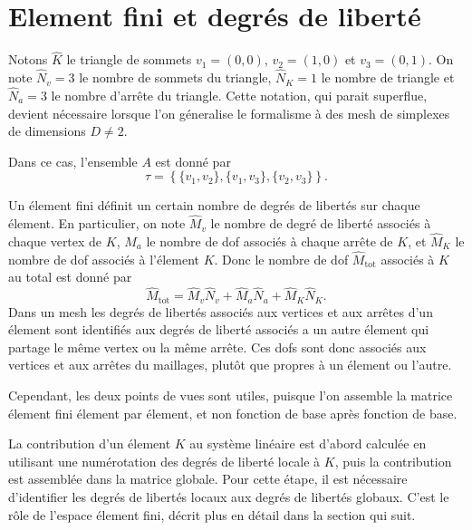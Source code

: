\section{Element fini et degr\'es de libert\'e}
Notons $\hat K$ le triangle de sommets $v_1 = (0,0)$, $v_2 = (1,0)$ et
$v_3 = (0, 1)$. On note $\hat N_v = 3$ le nombre de sommets du
triangle, $\hat N_K = 1$ le nombre de triangle et $\hat N_a = 3$ le
nombre d'arr\^ete du triangle. Cette notation, qui parait superflue,
devient n\'ecessaire lorsque l'on g\'eneralise le formalisme \`a des
mesh de simplexes de dimensions $D \neq 2$.

Dans ce cas, l'ensemble $A$ est donn\'e par 
\begin{equation}
  \tau = \left\{ \{v_1, v_2\}, \{v_1, v_3\}, \{v_2, v_3\} \right\}.
\end{equation}

Un \'element fini d\'efinit un certain nombre de degr\'es de
libert\'es sur chaque \'element. En particulier, on note $\hat M_v$ le
nombre de degr\'e de libert\'e associ\'es \`a chaque vertex de $K$,
$\hat M_a$ le nombre de dof associ\'es \`a chaque arr\^ete de $K$, et
$\hat M_K$ le nombre de dof associ\'es \`a l'\'element $K$. Donc le
nombre de dof $\hat M_\text{tot}$ associ\'es \`a $K$ au total est donn\'e par 
\begin{equation}
  \hat M_\text{tot} = \hat M_v \hat N_v + \hat M_a \hat N_a + \hat M_K \hat N_K.
\end{equation}
Dans un mesh les degr\'es de libert\'es associ\'es aux vertices et aux
arr\^etes d'un \'element sont identifi\'es aux degr\'es de libert\'e
associ\'es a un autre \'element qui partage le m\^eme vertex ou la
m\^eme arr\^ete. Ces dofs sont donc associ\'es aux vertices et aux
arr\^etes du maillages, plut\^ot que propres \`a un \'element ou
l'autre.

Cependant, les deux points de vues sont utiles, puisque l'on assemble
la matrice \'element fini \'element par \'element, et non fonction de
base apr\`es fonction de base.

La contribution d'un \'element $K$ au syst\`eme lin\'eaire est d'abord
calcul\'ee en utilisant une num\'erotation des degr\'es de libert\'e
locale \`a $K$, puis la contribution est assembl\'ee dans la matrice
globale. Pour cette \'etape, il est n\'ecessaire d'identifier les
degr\'es de libert\'es locaux aux degr\'es de libert\'es globaux. C'est
le r\^ole de l'espace \'element fini, d\'ecrit plus en d\'etail dans
la section qui suit.

